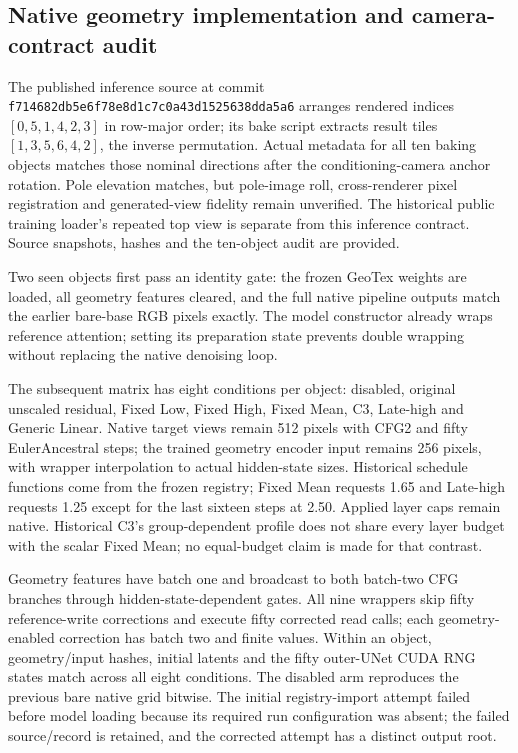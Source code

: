 \documentclass[11pt]{article}
\begin{document}
\subsection*{Native geometry implementation and camera-contract audit}
The published inference source at commit \texttt{f714682db5e6f78e8d1c7c0a43d1525638dda5a6} arranges rendered indices $[0,5,1,4,2,3]$ in row-major order; its bake script extracts result tiles $[1,3,5,6,4,2]$, the inverse permutation. Actual metadata for all ten baking objects matches those nominal directions after the conditioning-camera anchor rotation. Pole elevation matches, but pole-image roll, cross-renderer pixel registration and generated-view fidelity remain unverified. The historical public training loader's repeated top view is separate from this inference contract. Source snapshots, hashes and the ten-object audit are provided.

Two seen objects first pass an identity gate: the frozen GeoTex weights are loaded, all geometry features cleared, and the full native pipeline outputs match the earlier bare-base RGB pixels exactly. The model constructor already wraps reference attention; setting its preparation state prevents double wrapping without replacing the native denoising loop.

The subsequent matrix has eight conditions per object: disabled, original unscaled residual, Fixed Low, Fixed High, Fixed Mean, C3, Late-high and Generic Linear. Native target views remain 512 pixels with CFG2 and fifty EulerAncestral steps; the trained geometry encoder input remains 256 pixels, with wrapper interpolation to actual hidden-state sizes. Historical schedule functions come from the frozen registry; Fixed Mean requests 1.65 and Late-high requests 1.25 except for the last sixteen steps at 2.50. Applied layer caps remain native. Historical C3's group-dependent profile does not share every layer budget with the scalar Fixed Mean; no equal-budget claim is made for that contrast.

Geometry features have batch one and broadcast to both batch-two CFG branches through hidden-state-dependent gates. All nine wrappers skip fifty reference-write corrections and execute fifty corrected read calls; each geometry-enabled correction has batch two and finite values. Within an object, geometry/input hashes, initial latents and the fifty outer-UNet CUDA RNG states match across all eight conditions. The disabled arm reproduces the previous bare native grid bitwise. The initial registry-import attempt failed before model loading because its required run configuration was absent; the failed source/record is retained, and the corrected attempt has a distinct output root.
\end{document}
